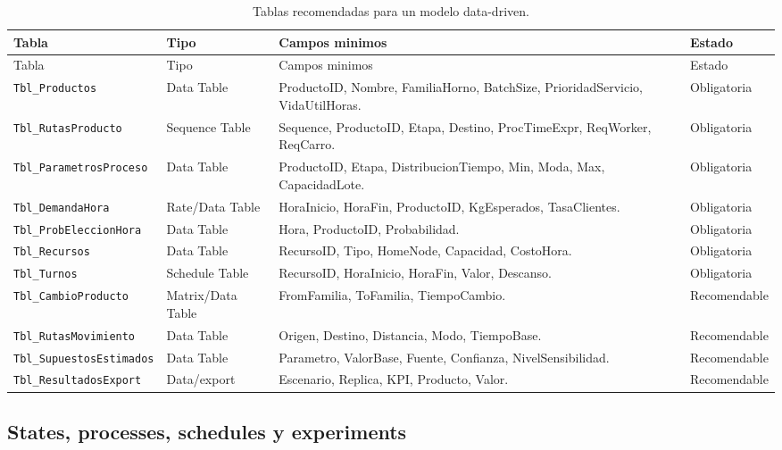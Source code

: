 \documentclass[12pt]{article}
\newcommand{\archivo}[1]{\texttt{#1}}
\begin{document}
\scriptsize
\begin{longtable}{L{3.1cm}L{2.6cm}L{6.7cm}L{2.2cm}}
\caption{Tablas recomendadas para un modelo data-driven.}\\
\toprule
{}
\color{white}Tabla & \color{white}Tipo & \color{white}Campos minimos & \color{white}Estado \\
\midrule
\endfirsthead
\toprule
{}
\color{white}Tabla & \color{white}Tipo & \color{white}Campos minimos & \color{white}Estado \\
\midrule
\endhead
\archivo{Tbl\_Productos} & Data Table & ProductoID, Nombre, FamiliaHorno, BatchSize, PrioridadServicio, VidaUtilHoras. & Obligatoria \\
\archivo{Tbl\_RutasProducto} & Sequence Table & Sequence, ProductoID, Etapa, Destino, ProcTimeExpr, ReqWorker, ReqCarro. & Obligatoria \\
\archivo{Tbl\_ParametrosProceso} & Data Table & ProductoID, Etapa, DistribucionTiempo, Min, Moda, Max, CapacidadLote. & Obligatoria \\
\archivo{Tbl\_DemandaHora} & Rate/Data Table & HoraInicio, HoraFin, ProductoID, KgEsperados, TasaClientes. & Obligatoria \\
\archivo{Tbl\_ProbEleccionHora} & Data Table & Hora, ProductoID, Probabilidad. & Obligatoria \\
\archivo{Tbl\_Recursos} & Data Table & RecursoID, Tipo, HomeNode, Capacidad, CostoHora. & Obligatoria \\
\archivo{Tbl\_Turnos} & Schedule Table & RecursoID, HoraInicio, HoraFin, Valor, Descanso. & Obligatoria \\
\archivo{Tbl\_CambioProducto} & Matrix/Data Table & FromFamilia, ToFamilia, TiempoCambio. & Recomendable \\
\archivo{Tbl\_RutasMovimiento} & Data Table & Origen, Destino, Distancia, Modo, TiempoBase. & Recomendable \\
\archivo{Tbl\_SupuestosEstimados} & Data Table & Parametro, ValorBase, Fuente, Confianza, NivelSensibilidad. & Recomendable \\
\archivo{Tbl\_ResultadosExport} & Data/export & Escenario, Replica, KPI, Producto, Valor. & Recomendable \\
\bottomrule
\end{longtable}
\normalsize

\subsection{States, processes, schedules y experiments}
\end{document}
